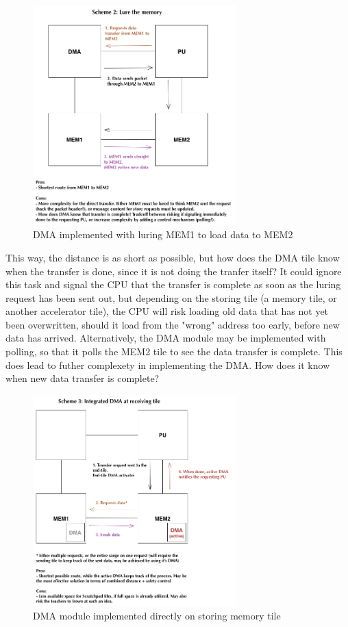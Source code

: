 \begin{figure}[h!]
    \centering
    \includegraphics[width=0.7\textwidth]{Figures/DMA/DMASHMAC2}
    \caption{DMA implemented with luring MEM1 to load data to MEM2}
    \label{fig:DMASHMAC2}
\end{figure}
 
This way, the distance is as short as possible, but how does the DMA tile know when the transfer is done, since it is not doing the tranfer itself?
It could ignore this task and signal the CPU that the transfer is complete as soon as the luring request has been sent out, but depending on the storing tile (a memory tile, or another accelerator tile), the CPU will risk loading old data that has not yet been overwritten, should it load from the "wrong" address too early, before new data has arrived.
Alternatively, the DMA module may be implemented with polling, so that it polls the MEM2 tile to see the data transfer is complete.
This does lead to futher complexety in implementing the DMA.
How does it know when new data transfer is complete?
 
\begin{figure}[h!]
    \centering
    \includegraphics[width=0.7\textwidth]{Figures/DMA/DMASHMAC3}
    \caption{DMA module implemented directly on storing memory tile}
    \label{fig:DMASHMAC3}
\end{figure}
 
